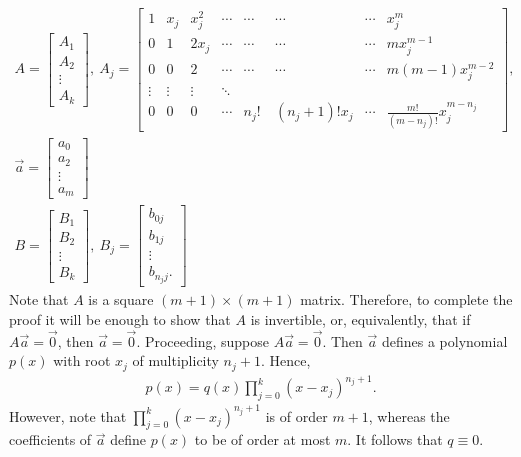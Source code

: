 \documentclass[12pt,reqno]{amsart}
\numberwithin{equation}{section}  %
\begin{document}
\begin{gather*}
A= \begin{bmatrix}
A_1
\\
A_2
\\
\vdots
\\
A_k
\end{bmatrix}
, \ A_j=\begin{bmatrix}
1 & x_{j} & x_{j}^{2} & \cdots &\cdots &\cdots & \cdots &x_{j}^{m}\\
0 &1 &2x_{j} & \cdots &\cdots &\cdots &\cdots &mx_{j}^{m-1}\\
0 &0 &2 & \cdots &\cdots &\cdots &\cdots &m(m-1)x_{j}^{m-2}\\
\vdots & \vdots &\vdots &\ddots &\\
0 &0 &0 &\cdots & n_j! \  & (n_j + 1)! x_j & \cdots &\frac{m!}{(m-n_{j})!} x_j^{m -n_{j}}
\end{bmatrix},
\\
\vec{a}=\begin{bmatrix}
a_{0}\\
a_{2}\\
\vdots\\
a_{m}
\end{bmatrix}
\\
B = \begin{bmatrix}
B_1\\
B_2\\
\vdots \\
B_k
\end{bmatrix}
, \ B_j=
\begin{bmatrix}
b_{0j}\\
b_{1j}\\
\vdots \\
b_{n_j j}.
\end{bmatrix}
\end{gather*}
Note that $A$ is a square $(m+1) \times (m+1)$ matrix. Therefore, to complete
the proof it will be enough to show that $A$ is invertible, or, equivalently,
that if $A \vec{a}=\vec{0}$, then $\vec{a} = \vec{0}$. Proceeding, suppose
$A \vec{a}=\vec{0}$. Then $\vec{a}$ defines a polynomial $p(x)$ with root $x_j$ of
multiplicity $n_j +1$. Hence,
\begin{equation*}
\begin{split}
p(x) = q(x) \prod_{j=0}^{k}(x-x_{j})^{n_{j}+1}.
\end{split}
\end{equation*}
However, note that $\prod_{j=0}^{k}(x-x_{j})^{n_{j}+1}$ is of order $m+1$,
whereas the coefficients of $\vec{a}$ define $p(x)$ to be of order at most $m$.
It follows that $q \equiv 0$. \qquad \qedsymbol
\end{document}
